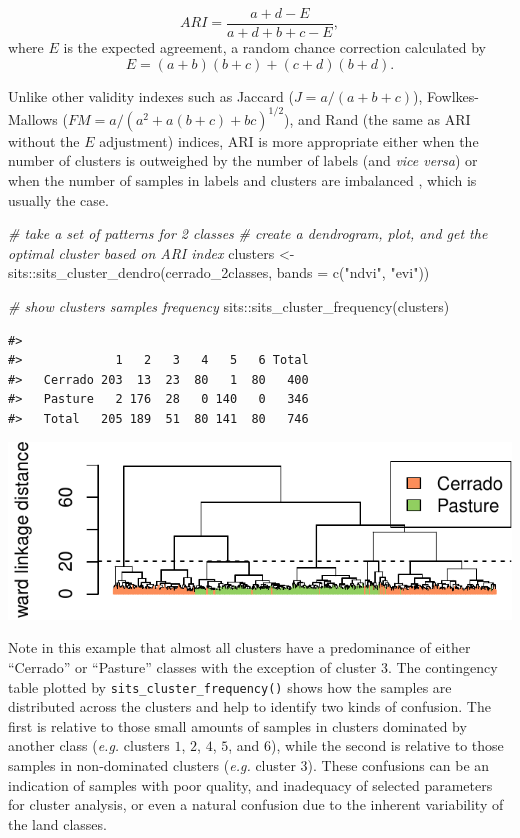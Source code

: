 \documentclass[a4paper,]{tufte-book}
\newenvironment{Shaded}{}{}
\newcommand{\AttributeTok}[1]{\textcolor[rgb]{0.49,0.56,0.16}{#1}}
\newcommand{\CommentTok}[1]{\textcolor[rgb]{0.38,0.63,0.69}{\textit{#1}}}
\newcommand{\FunctionTok}[1]{\textcolor[rgb]{0.02,0.16,0.49}{#1}}
\newcommand{\NormalTok}[1]{#1}
\newcommand{\OtherTok}[1]{\textcolor[rgb]{0.00,0.44,0.13}{#1}}
\newcommand{\SpecialCharTok}[1]{\textcolor[rgb]{0.25,0.44,0.63}{#1}}
\newcommand{\StringTok}[1]{\textcolor[rgb]{0.25,0.44,0.63}{#1}}
\begin{document}
\[
ARI=\frac{a+d-E}{a+d+b+c-E},
\]
where \(E\) is the expected agreement, a random chance correction calculated by
\[
E=(a+b)(b+c)+(c+d)(b+d).
\]

Unlike other validity indexes such as Jaccard (\({J=a/(a+b+c)}\)), Fowlkes-Mallows (\({FM=a/(a^2+a(b+c)+bc)^{1/2}}\)), and Rand (the same as ARI without the \(E\) adjustment) indices, ARI is more appropriate either when the number of clusters is outweighed by the number of labels (and \emph{vice versa}) or when the number of samples in labels and clusters are imbalanced \citep{Hubert1985}, which is usually the case.

\begin{Shaded}
\begin{Highlighting}[]
\CommentTok{\# take a set of patterns for 2 classes}
\CommentTok{\# create a dendrogram, plot, and get the optimal cluster based on ARI index}
\NormalTok{clusters }\OtherTok{\textless{}{-}}\NormalTok{ sits}\SpecialCharTok{::}\FunctionTok{sits\_cluster\_dendro}\NormalTok{(cerrado\_2classes, }
                                         \AttributeTok{bands =} \FunctionTok{c}\NormalTok{(}\StringTok{"ndvi"}\NormalTok{, }\StringTok{"evi"}\NormalTok{))}

\CommentTok{\# show clusters samples frequency}
\NormalTok{sits}\SpecialCharTok{::}\FunctionTok{sits\_cluster\_frequency}\NormalTok{(clusters)}
\end{Highlighting}
\end{Shaded}

\begin{verbatim}
#>          
#>             1   2   3   4   5   6 Total
#>   Cerrado 203  13  23  80   1  80   400
#>   Pasture   2 176  28   0 140   0   346
#>   Total   205 189  51  80 141  80   746
\end{verbatim}

\begin{center}\includegraphics[width=0.7\linewidth]{sitsbook_files/figure-latex/dendrogram-1} \end{center}

Note in this example that almost all clusters have a predominance of either ``Cerrado'' or ``Pasture'' classes with the exception of cluster \(3\). The contingency table plotted by \texttt{sits\_cluster\_frequency()} shows how the samples are distributed across the clusters and help to identify two kinds of confusion. The first is relative to those small amounts of samples in clusters dominated by another class (\emph{e.g.} clusters \(1\), \(2\), \(4\), \(5\), and \(6\)), while the second is relative to those samples in non-dominated clusters (\emph{e.g.} cluster \(3\)). These confusions can be an indication of samples with poor quality, and inadequacy of selected parameters for cluster analysis, or even a natural confusion due to the inherent variability of the land classes.
\end{document}
